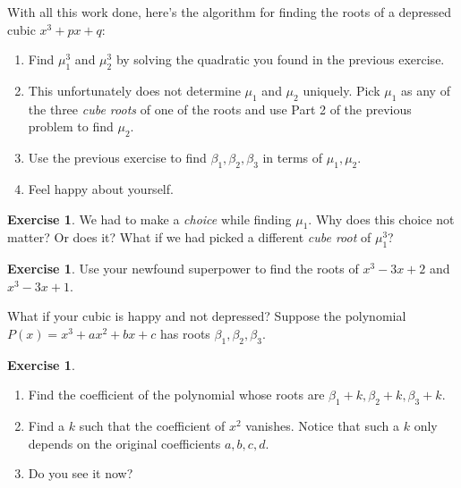 \documentclass[reqno, 12pt, letter]{article}
\theoremstyle{plain}
\theoremstyle{definition}
\newtheorem{exercise}[theorem]{Exercise}
\theoremstyle{remark}
\numberwithin{equation}{section}
\begin{document}
	\begin{mdframed}
		With all this work done, here's the algorithm for finding the roots of a depressed cubic $ x^3 + px + q$:
		\begin{enumerate}
			\item Find $ \mu_1^3$ and $ \mu_2^3$ by solving the quadratic you found in the previous exercise. 
			\item This unfortunately does not determine $ \mu_1$ and $ \mu_2$ uniquely. Pick $ \mu_1$ as any of the three \emph{cube roots} of one of the roots and use Part 2 of the previous problem to find $ \mu_2$.
			\item Use the previous exercise to find $ \beta_1, \beta_2, \beta_3$ in terms of $ \mu_1, \mu_2$. 
			\item Feel happy about yourself.
		\end{enumerate}
	\end{mdframed}
	
	\begin{exercise}
		We had to make a \emph{choice} while finding $ \mu_1$. Why does this choice not matter? Or does it? What if we had picked a different \emph{cube root} of $ \mu_1^3$?
	\end{exercise}
	
	\begin{exercise}
		Use your newfound superpower to find the roots of $x^3 - 3x + 2$ and $x^3 - 3x + 1$.
	\end{exercise}
	
	What if your cubic is happy and not depressed? Suppose the polynomial $ P(x) = x^3 + ax^2 + bx + c$ has roots $ \beta_1, \beta_2, \beta_3$. 
	\begin{exercise} $ $
		\begin{enumerate}
			\item Find the coefficient of the polynomial whose roots are $ \beta_1 + k, \beta_2 + k, \beta_3 + k$.
			\item Find a $ k$ such that the coefficient of $ x^2$ vanishes. Notice that such a $ k$ only depends on the original coefficients $ a,b,c,d$.
			\item Do you see it now?
		\end{enumerate}
	\end{exercise}
	
	
	
	
	
	
	
\end{document}
